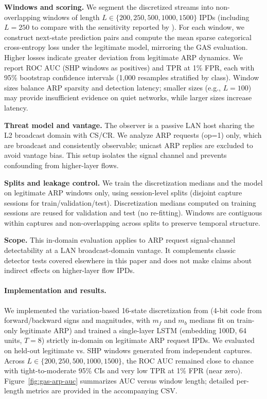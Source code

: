 \textbf{Windows and scoring.} We segment the discretized streams into non-overlapping windows of length $L \in \{200, 250, 500, 1000, 1500\}$ IPDs (including $L{=}250$ to compare with the sensitivity reported by \cite{li2022GAS}). For each window, we construct next-state prediction pairs and compute the mean sparse categorical cross-entropy loss under the legitimate model, mirroring the GAS evaluation. Higher losses indicate greater deviation from legitimate ARP dynamics. We report ROC AUC (SHP windows as positives) and TPR at 1\% FPR, each with 95\% bootstrap confidence intervals (1{,}000 resamples stratified by class). Window sizes balance ARP sparsity and detection latency; smaller sizes (e.g., $L{=}100$) may provide insufficient evidence on quiet networks, while larger sizes increase latency.

\textbf{Threat model and vantage.} The observer is a passive LAN host sharing the L2 broadcast domain with \ac{CS}/\ac{CR}. We analyze ARP requests (op=1) only, which are broadcast and consistently observable; unicast ARP replies are excluded to avoid vantage bias. This setup isolates the signal channel and prevents confounding from higher-layer flows.

\textbf{Splits and leakage control.} We train the discretization medians and the model on legitimate ARP windows only, using session-level splits (disjoint capture sessions for train/validation/test). Discretization medians computed on training sessions are reused for validation and test (no re-fitting). Windows are contiguous within captures and non-overlapping across splits to preserve temporal structure.

\textbf{Scope.} This in-domain evaluation applies to ARP request signal-channel detectability at a LAN broadcast-domain vantage. It complements classic detector tests covered elsewhere in this paper and does not make claims about indirect effects on higher-layer flow IPDs.

\paragraph*{Implementation and results.}
We implemented the variation-based 16-state discretization from \cite{li2022GAS} (4-bit code from forward/backward signs and magnitudes, with $m_f$ and $m_b$ medians fit on train-only legitimate ARP) and trained a single-layer LSTM (embedding 100D, 64 units, $T{=}8$) strictly in-domain on legitimate ARP request IPDs. We evaluated on held-out legitimate vs. SHP windows generated from independent captures. Across $L \in \{200, 250, 500, 1000, 1500\}$, the ROC AUC remained close to chance with tight-to-moderate 95\% CIs and very low TPR at 1\% FPR (near zero). Figure~\ref{fig:gas-arp-auc} summarizes AUC versus window length; detailed per-length metrics are provided in the accompanying CSV.

